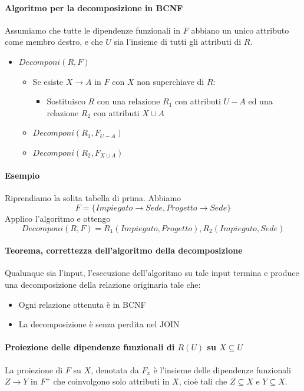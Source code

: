 \paragraph{Algoritmo per la decomposizione in BCNF}  Assumiamo che tutte le dipendenze funzionali in $F$ abbiano un unico attributo come membro destro, e che $U$ sia l'insieme di tutti gli attributi di $R$.
\begin{itemize}
	\item $Decomponi(R,F)$
	\begin{itemize}
		\item Se esiste $X \to A$ in $F$ con $X$ non superchiave di $R$:
		\begin{itemize}
			\item Sostituisco $R$ con una relazione $R_1$ con attributi $U-A$ ed una relazione $R_2$ con attributi $X \cup A$
		\end{itemize}
		\item $Decomponi(R_1,F_{U-A})$
		\item $Decomponi(R_2,F_{X \cup A})$
	\end{itemize}
\end{itemize}
\paragraph{Esempio} Riprendiamo la solita tabella di prima. Abbiamo
\[F=\{Impiegato \to Sede, Progetto \to Sede \}\]
Applico l'algoritmo e ottengo
\[Decomponi(R,F)= R_1(Impiegato,Progetto), R_2(Impiegato, Sede)\]
\paragraph{Teorema, correttezza dell'algoritmo della decomposizione} Qualunque sia l'input, l'esecuzione dell'algoritmo su tale input termina e produce una decomposizione della relazione originaria tale che:
\begin{itemize}
	\item Ogni relazione ottenuta è in BCNF
	\item La decomposizione è senza perdita nel JOIN
\end{itemize}
\paragraph{Proiezione delle dipendenze funzionali di $R(U)$ su $X \subseteq U$} La proiezione di $F$ su $X$, denotata da $F_x$ è l'insieme delle dipendenze funzionali $Z \to Y$ in $F^+$ che coinvolgono solo attributi in $X$, cioè tali che $Z \subseteq X$ e $Y \subseteq X$.
